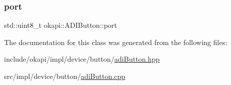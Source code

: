 \subsubsection{\texorpdfstring{port}{port}}
{\footnotesize\ttfamily std\+::uint8\+\_\+t okapi\+::\+A\+D\+I\+Button\+::port\hspace{0.3cm}{\ttfamily [protected]}}



The documentation for this class was generated from the following files\+:\begin{DoxyCompactItemize}
\item 
include/okapi/impl/device/button/\mbox{\hyperlink{adiButton_8hpp}{adi\+Button.\+hpp}}\item 
src/impl/device/button/\mbox{\hyperlink{adiButton_8cpp}{adi\+Button.\+cpp}}\end{DoxyCompactItemize}
